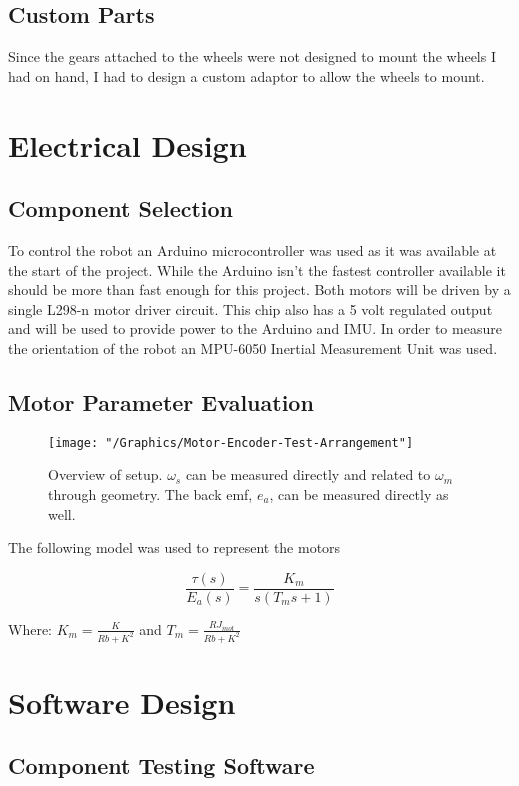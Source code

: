 \documentclass{article}
\begin{document}
		
	\subsection{Custom Parts}
	Since the gears attached to the wheels were not designed to mount the wheels I had on hand, I had to design a custom adaptor to allow the wheels to mount. 

\section{Electrical Design}
	\subsection{Component Selection}
	To control the robot an Arduino microcontroller was used as it was available at the start of the project. While the Arduino isn't the fastest controller available it should be more than fast enough for this project.
	Both motors will be driven by a single L298-n motor driver circuit. This chip also has a 5 volt regulated output and will be used to provide power to the Arduino and IMU. 
	In order to measure the orientation of the robot an MPU-6050 Inertial Measurement Unit was used.
	
	
	\subsection{Motor Parameter Evaluation}
	\begin{figure}[h]
		\centerline{\texttt{[image: "/Graphics/Motor-Encoder-Test-Arrangement"]}}
		\caption{Overview of setup. $\omega_s$ can be measured directly and related to $\omega_m$ through geometry. The back emf, $e_a$, can be measured directly as well.}
		\label{fig:DirectFeedRL}
	\end{figure}
	
	The following model was used to represent the motors\cite{Ogata}
	
	\begin{equation}
		\frac{\tau (s)}{E_a (s)} = \frac{K_m}{s(T_m s + 1)}
	\end{equation}		
	
	\centerline{Where: $K_m = \frac{K}{Rb + K^2}$ and $T_m = \frac{RJ_{mot}}{Rb + K^2}$}
	

\section{Software Design}
	\subsection{Component Testing Software}
	
\end{document}
